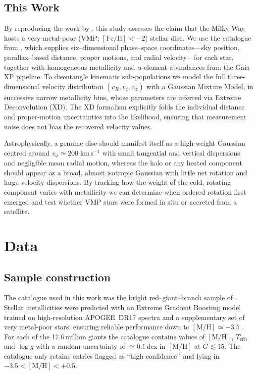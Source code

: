 \documentclass[a4paper,12pt]{article}
\begin{document}
\subsection{This Work}

By reproducing the work by \citet{zhang2024existencemetalpoordiscmilky}, this study assesses 
the claim that the Milky Way hosts a very-metal-poor (VMP; $[\mathrm{Fe/H}]<-2$) stellar disc. 
We use the catalogue from \citet{Andrae2023}, 
which supplies six–dimensional phase–space coordinates—sky position, parallax–based distance, 
proper motions, and radial velocity—for each star, together with homogeneous metallicity and 
$\alpha$-element abundances from the Gaia XP pipeline. To disentangle kinematic 
sub-populations we model the full three-dimensional 
velocity distribution $(v_R,v_\phi,v_z)$ with a Gaussian Mixture Model, in successive narrow metallicity bins, 
whose parameters are inferred 
via Extreme Deconvolution (XD). The XD formalism explicitly folds the individual distance and 
proper-motion uncertainties into the likelihood, ensuring that measurement noise does not bias 
the recovered velocity values.

Astrophysically, a genuine disc should manifest itself as a high-weight Gaussian centred around 
$v_\phi\simeq200\;\mathrm{km\,s^{-1}}$ with small tangential and vertical dispersions 
and negligible mean radial motion, whereas the 
halo or any heated component should appear as a broad, almost isotropic Gaussian with little net rotation 
and large velocity dispersions.  By tracking how the weight of the cold, 
rotating component varies with metallicity we can determine when ordered rotation first emerged and 
test whether VMP stars were formed in situ or accreted from a satellite.


\section{Data}
\label{sec:data}

\subsection{Sample construction}\label{subsec:data_sample}

The catalogue used in this work was the bright red–giant–branch sample of \citet{Andrae2023}.  
Stellar metallicities were predicted with an Extreme Gradient Boosting model 
trained on high-resolution \textsc{APOGEE}~DR17 spectra and a supplementary 
set of very metal-poor stars, ensuring reliable performance down to 
$[\mathrm{M/H}]\simeq-3.5$ \citep{Andrae2023}.  
For each of the 17.6\,million giants the catalogue contains values of 
$[\mathrm{M/H}]$, $T_{\mathrm{eff}}$, and $\log g$ with a random uncertainty 
of $\simeq0.1$\,dex in $[\mathrm{M/H}]$ at $G\!\lesssim\!15$.  
The catalogue only retains entries flagged as “high-confidence’’ and lying 
in $-3.5<[\mathrm{M/H}]<+0.5$.
\end{document}
